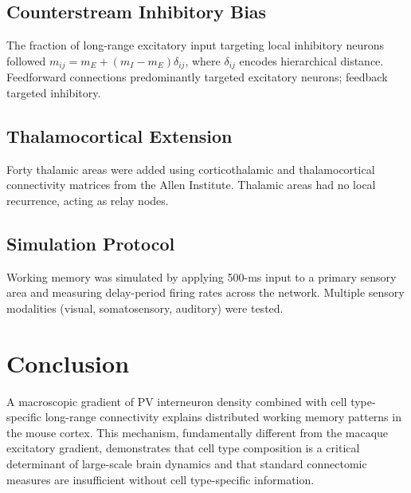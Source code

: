 \documentclass[11pt]{article}
\begin{document}
\subsection{Counterstream Inhibitory Bias}
The fraction of long-range excitatory input targeting local inhibitory neurons followed $m_{ij} = m_E + (m_I - m_E)\delta_{ij}$, where $\delta_{ij}$ encodes hierarchical distance. Feedforward connections predominantly targeted excitatory neurons; feedback targeted inhibitory.

\subsection{Thalamocortical Extension}
Forty thalamic areas were added using corticothalamic and thalamocortical connectivity matrices from the Allen Institute. Thalamic areas had no local recurrence, acting as relay nodes.

\subsection{Simulation Protocol}
Working memory was simulated by applying 500-ms input to a primary sensory area and measuring delay-period firing rates across the network. Multiple sensory modalities (visual, somatosensory, auditory) were tested.

\section{Conclusion}

A macroscopic gradient of PV interneuron density combined with cell type-specific long-range connectivity explains distributed working memory patterns in the mouse cortex. This mechanism, fundamentally different from the macaque excitatory gradient, demonstrates that cell type composition is a critical determinant of large-scale brain dynamics and that standard connectomic measures are insufficient without cell type-specific information.



\end{document}
